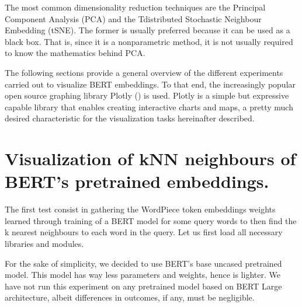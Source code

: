 \documentclass[letterpaper,10pt,english]{sphinxmanual}
\begin{document}
The most common dimensionality reduction techniques are the Principal Component Analysis (PCA) and the T\sphinxhyphen{}distributed Stochastic Neighbour Embedding (t\sphinxhyphen{}SNE). The former is usually preferred because it can be used as a black box. That is, since it is a non\sphinxhyphen{}parametric method, it is not usually required to know the mathematics behind PCA.

The following sections provide a general overview of the different experiments carried out to visualize BERT embeddings. To that end, the increasingly popular open source graphing library Plotly () is used. Plotly is a simple but expressive capable library that enables creating interactive charts and maps, a pretty much desired characteristic for the visualization tasks hereinafter described.


\section{Visualization of kNN neighbours of BERT’s pretrained embeddings.}
\label{\detokenize{Visualization of BERT embeddings:Visualization-of-kNN-neighbours-of-BERT_u2019s-pretrained-embeddings.}}
The first test consist in gathering the WordPiece token embeddings weights learned through training of a BERT model for some query words to then find the k nearest neighbours to each word in the query. Let us first load all necessary libraries and modules.

{
\begin{sphinxVerbatim}[commandchars=\\\{\}]
\llap{\color{nbsphinxin}[1]:\,\hspace{\fboxrule}\hspace{\fboxsep}}   
   
   
    

\end{sphinxVerbatim}
}

For the sake of simplicity, we decided to use BERT’s base uncased pretrained model. This model has way less parameters and weights, hence is lighter. We have not run this experiment on any pretrained model based on BERT Large architecture, albeit differences in outcomes, if any, must be negligible.
\end{document}
